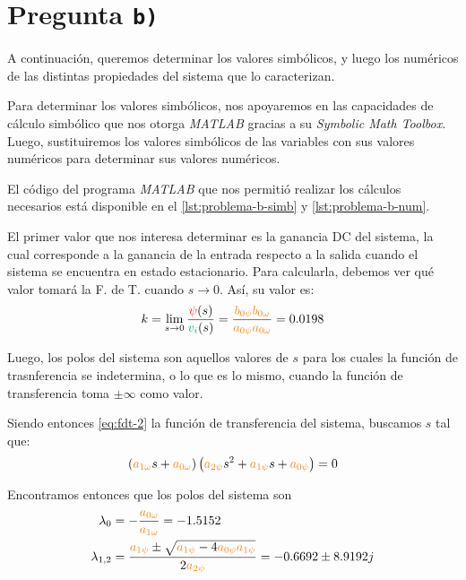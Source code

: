 \section{Pregunta \texttt{b)}}\label{pregunta-b}

A continuación, queremos determinar los valores simbólicos, y luego los
numéricos de las distintas propiedades del sistema que lo caracterizan.

Para determinar los valores simbólicos, nos apoyaremos en las capacidades
de cálculo simbólico que nos otorga \textit{MATLAB} gracias a su
\textit{Symbolic Math Toolbox}. Luego, sustituiremos los valores simbólicos de
las variables con sus valores numéricos para determinar sus valores numéricos.

El código del programa \textit{MATLAB} que nos permitió realizar los cálculos
necesarios está disponible en el \autoref{lst:problema-b-simb} y
\autoref{lst:problema-b-num}.

El primer valor que nos interesa determinar es la ganancia DC del sistema, la
cual corresponde a la ganancia de la entrada respecto a la salida cuando el
sistema se encuentra en estado estacionario. Para calcularla, debemos ver qué
valor tomará la F. de T. cuando $s \to 0$. Así, su valor es:
\begin{equation}\label{eq:gdc}
  k = \lim_{s \to 0} \frac{\rojo{\psi}(s)}{\verd{v_{i}}(s)} =
    \frac{\nara{b_{0\psi}b_{0\omega}}}{\nara{a_{0\psi}a_{0\omega}}} = 0.0198
\end{equation}

Luego, los polos del sistema son aquellos valores de $s$ para los cuales la
función de trasnferencia se indetermina, o lo que es lo mismo, cuando la
función de transferencia toma $\pm\infty$ como valor.

Siendo entonces \eqref{eq:fdt-2} la función de transferencia del sistema,
buscamos $s$ tal que:
\begin{equation}
  \left(\nara{a_{1\omega}}s + \nara{a_{0\omega}}\right)\left(\nara{a_{2\psi}}s^{2} + \nara{a_{1\psi}}s + \nara{a_{0\psi}}\right) = 0
\end{equation}

Encontramos entonces que los polos del sistema son
\begin{align}
  \lambda_{0} &= -\frac{\nara{a_{0\omega}}}{\nara{a_{1\omega}}} = -1.5152 \\
  \lambda_{1,2} &= \frac{\nara{a_{1\psi}} \pm \sqrt{\nara{a_{1\psi}} - 4 \nara{a_{0\psi}a_{1\psi}}}}{2\nara{a_{2\psi}}} = -0.6692 \pm 8.9192j
\end{align}

